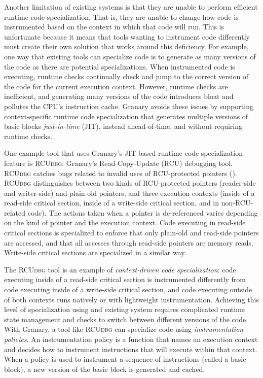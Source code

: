 \documentclass[preprint]{sigplanconf}
\newcommand{\toolname}[1]{{\scshape #1}}
\begin{document}
Another limitation of existing systems is that they are unable to perform efficient runtime code specialization. That is, they are unable to change how code is instrumented based on the context in which that code will run. This is unfortunate because it means that tools wanting to instrument code differently must create their own solution that works around this deficiency. For example, one way that existing tools can specialize code is to generate as many versions of the code as there are potential specializations. When instrumented code is executing, runtime checks continually check and jump to the correct version of the code for the current execution context. However, runtime checks are inefficient, and generating many versions of the code introduces bloat and pollutes the CPU's instruction cache. Granary avoids these issues by supporting context-specific runtime code specialization that generates multiple versions of basic blocks \emph{just-in-time} (JIT), instead ahead-of-time, and without requiring runtime checks.

One example tool that uses Granary's JIT-based runtime code specialization feature is \toolname{RCUdbg}: Granary's Read-Copy-Update (RCU) debugging tool. \toolname{RCUdbg} catches bugs related to invalid uses of RCU-protected pointers (). \toolname{RCUdbg} distinguishes between two kinds of RCU-protected pointers (reader-side and writer-side) and plain old pointers, and three execution contexts (inside of a read-side critical section, inside of a write-side critical section, and in non-RCU-related code). The actions taken when a pointer is de-referenced varies depending on the kind of pointer and the execution context. Code executing in read-side critical sections is specialized to enforce that only plain-old and read-side pointers are accessed, and that all accesses through read-side pointers are memory reads. Write-side critical sections are specialized in a similar way.

The \toolname{RCUdbg} tool is an example of \emph{context-driven code specialization}: code executing inside of a read-side critical section is instrumented differently from code executing inside of a write-side critical section, and code executing outside of both contexts runs natively or with lightweight instrumentation. Achieving this level of specialization using and existing system requires complicated runtime state management and checks to switch between different versions of the code. With Granary, a tool like \toolname{RCUdbg} can specialize code using \emph{instrumentation policies}. An instrumentation policy is a function that names an execution context and decides how to instrument instructions that will execute within that context. When a policy is used to instrument a sequence of instructions (called a basic block), a new version of the basic block is generated and cached. 
\end{document}
